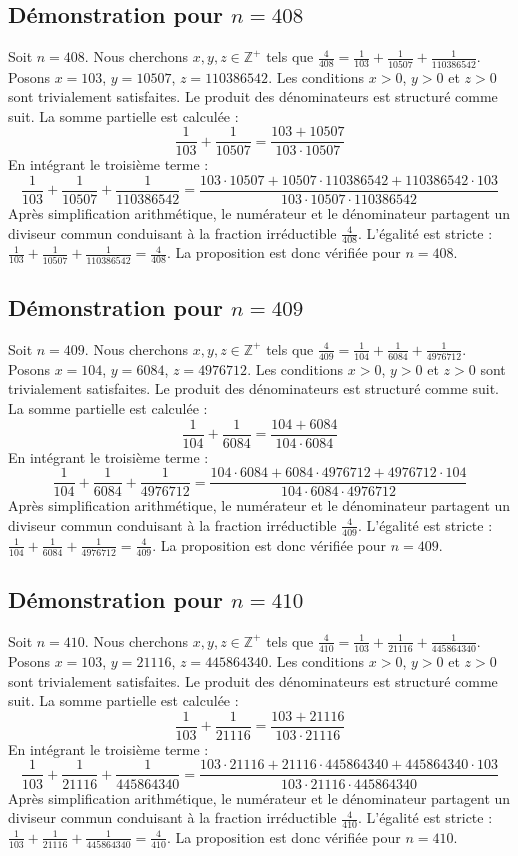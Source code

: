 \documentclass[11pt,a4paper]{article}
\begin{document}
\subsection{Démonstration pour $n = 408$}
Soit $n = 408$. Nous cherchons $x, y, z \in \mathbb{Z}^{+}$ tels que $\frac{4}{408} = \frac{1}{103} + \frac{1}{10507} + \frac{1}{110386542}$.
Posons $x = 103$, $y = 10507$, $z = 110386542$.
Les conditions $x > 0$, $y > 0$ et $z > 0$ sont trivialement satisfaites.
Le produit des dénominateurs est structuré comme suit. La somme partielle est calculée :
$$ \frac{1}{103} + \frac{1}{10507} = \frac{103+10507}{103 \cdot 10507} $$
En intégrant le troisième terme :
$$ \frac{1}{103} + \frac{1}{10507} + \frac{1}{110386542} = \frac{103 \cdot 10507 + 10507 \cdot 110386542 + 110386542 \cdot 103}{103 \cdot 10507 \cdot 110386542} $$
Après simplification arithmétique, le numérateur et le dénominateur partagent un diviseur commun conduisant à la fraction irréductible $\frac{4}{408}$.
L'égalité est stricte : $\frac{1}{103} + \frac{1}{10507} + \frac{1}{110386542} = \frac{4}{408}$.
La proposition est donc vérifiée pour $n = 408$.
\subsection{Démonstration pour $n = 409$}
Soit $n = 409$. Nous cherchons $x, y, z \in \mathbb{Z}^{+}$ tels que $\frac{4}{409} = \frac{1}{104} + \frac{1}{6084} + \frac{1}{4976712}$.
Posons $x = 104$, $y = 6084$, $z = 4976712$.
Les conditions $x > 0$, $y > 0$ et $z > 0$ sont trivialement satisfaites.
Le produit des dénominateurs est structuré comme suit. La somme partielle est calculée :
$$ \frac{1}{104} + \frac{1}{6084} = \frac{104+6084}{104 \cdot 6084} $$
En intégrant le troisième terme :
$$ \frac{1}{104} + \frac{1}{6084} + \frac{1}{4976712} = \frac{104 \cdot 6084 + 6084 \cdot 4976712 + 4976712 \cdot 104}{104 \cdot 6084 \cdot 4976712} $$
Après simplification arithmétique, le numérateur et le dénominateur partagent un diviseur commun conduisant à la fraction irréductible $\frac{4}{409}$.
L'égalité est stricte : $\frac{1}{104} + \frac{1}{6084} + \frac{1}{4976712} = \frac{4}{409}$.
La proposition est donc vérifiée pour $n = 409$.
\subsection{Démonstration pour $n = 410$}
Soit $n = 410$. Nous cherchons $x, y, z \in \mathbb{Z}^{+}$ tels que $\frac{4}{410} = \frac{1}{103} + \frac{1}{21116} + \frac{1}{445864340}$.
Posons $x = 103$, $y = 21116$, $z = 445864340$.
Les conditions $x > 0$, $y > 0$ et $z > 0$ sont trivialement satisfaites.
Le produit des dénominateurs est structuré comme suit. La somme partielle est calculée :
$$ \frac{1}{103} + \frac{1}{21116} = \frac{103+21116}{103 \cdot 21116} $$
En intégrant le troisième terme :
$$ \frac{1}{103} + \frac{1}{21116} + \frac{1}{445864340} = \frac{103 \cdot 21116 + 21116 \cdot 445864340 + 445864340 \cdot 103}{103 \cdot 21116 \cdot 445864340} $$
Après simplification arithmétique, le numérateur et le dénominateur partagent un diviseur commun conduisant à la fraction irréductible $\frac{4}{410}$.
L'égalité est stricte : $\frac{1}{103} + \frac{1}{21116} + \frac{1}{445864340} = \frac{4}{410}$.
La proposition est donc vérifiée pour $n = 410$.
\end{document}
